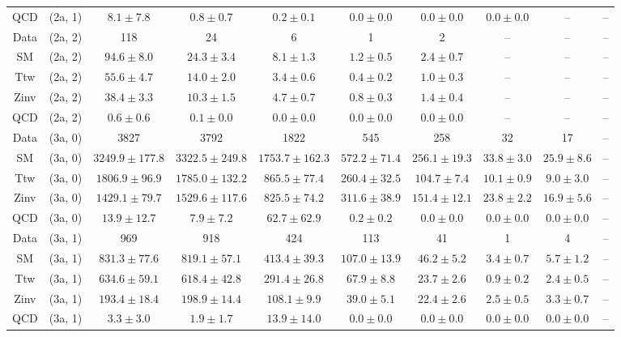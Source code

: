 \begin{table}[h!]
{\begin{tabular}{cccccccccc}
	QCD & (2a, 1) & $8.1\pm 7.8$ & $0.8\pm 0.7$ & $0.2\pm 0.1$ & $0.0\pm 0.0$ & $0.0\pm 0.0$ & $0.0\pm 0.0$ & -- & -- \\[0.5ex] 
	Data & (2a, 2) & 118 & 24 & 6 & 1 & 2 & -- & -- & -- \\[0.5ex] 
	SM & (2a, 2) & $94.6\pm 8.0$ & $24.3\pm 3.4$ & $8.1\pm 1.3$ & $1.2\pm 0.5$ & $2.4\pm 0.7$ & -- & -- & -- \\[0.5ex] 
	Ttw & (2a, 2) & $55.6\pm 4.7$ & $14.0\pm 2.0$ & $3.4\pm 0.6$ & $0.4\pm 0.2$ & $1.0\pm 0.3$ & -- & -- & -- \\[0.5ex] 
	Zinv & (2a, 2) & $38.4\pm 3.3$ & $10.3\pm 1.5$ & $4.7\pm 0.7$ & $0.8\pm 0.3$ & $1.4\pm 0.4$ & -- & -- & -- \\[0.5ex] 
	QCD & (2a, 2) & $0.6\pm 0.6$ & $0.1\pm 0.0$ & $0.0\pm 0.0$ & $0.0\pm 0.0$ & $0.0\pm 0.0$ & -- & -- & -- \\[0.5ex] 
	Data & (3a, 0) & 3827 & 3792 & 1822 & 545 & 258 & 32 & 17 & -- \\[0.5ex] 
	SM & (3a, 0) & $3249.9\pm 177.8$ & $3322.5\pm 249.8$ & $1753.7\pm 162.3$ & $572.2\pm 71.4$ & $256.1\pm 19.3$ & $33.8\pm 3.0$ & $25.9\pm 8.6$ & -- \\[0.5ex] 
	Ttw & (3a, 0) & $1806.9\pm 96.9$ & $1785.0\pm 132.2$ & $865.5\pm 77.4$ & $260.4\pm 32.5$ & $104.7\pm 7.4$ & $10.1\pm 0.9$ & $9.0\pm 3.0$ & -- \\[0.5ex] 
	Zinv & (3a, 0) & $1429.1\pm 79.7$ & $1529.6\pm 117.6$ & $825.5\pm 74.2$ & $311.6\pm 38.9$ & $151.4\pm 12.1$ & $23.8\pm 2.2$ & $16.9\pm 5.6$ & -- \\[0.5ex] 
	QCD & (3a, 0) & $13.9\pm 12.7$ & $7.9\pm 7.2$ & $62.7\pm 62.9$ & $0.2\pm 0.2$ & $0.0\pm 0.0$ & $0.0\pm 0.0$ & $0.0\pm 0.0$ & -- \\[0.5ex] 
	Data & (3a, 1) & 969 & 918 & 424 & 113 & 41 & 1 & 4 & -- \\[0.5ex] 
	SM & (3a, 1) & $831.3\pm 77.6$ & $819.1\pm 57.1$ & $413.4\pm 39.3$ & $107.0\pm 13.9$ & $46.2\pm 5.2$ & $3.4\pm 0.7$ & $5.7\pm 1.2$ & -- \\[0.5ex] 
	Ttw & (3a, 1) & $634.6\pm 59.1$ & $618.4\pm 42.8$ & $291.4\pm 26.8$ & $67.9\pm 8.8$ & $23.7\pm 2.6$ & $0.9\pm 0.2$ & $2.4\pm 0.5$ & -- \\[0.5ex] 
	Zinv & (3a, 1) & $193.4\pm 18.4$ & $198.9\pm 14.4$ & $108.1\pm 9.9$ & $39.0\pm 5.1$ & $22.4\pm 2.6$ & $2.5\pm 0.5$ & $3.3\pm 0.7$ & -- \\[0.5ex] 
	QCD & (3a, 1) & $3.3\pm 3.0$ & $1.9\pm 1.7$ & $13.9\pm 14.0$ & $0.0\pm 0.0$ & $0.0\pm 0.0$ & $0.0\pm 0.0$ & $0.0\pm 0.0$ & -- \\[0.5ex] 

\end{tabular}}
\end{table}
